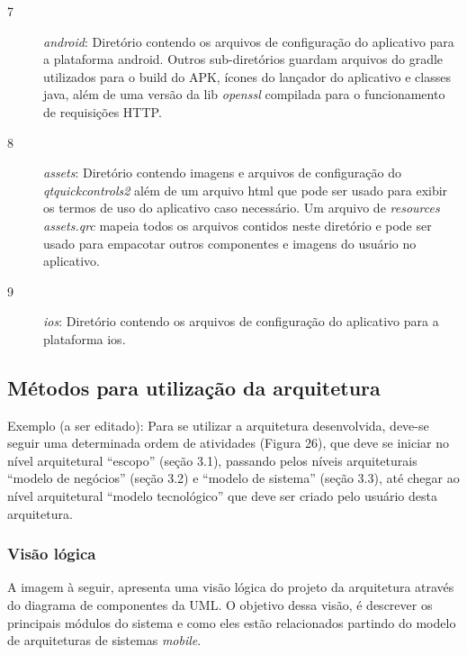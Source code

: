 \begin{description}
	\item[7] \textit{android}: Diretório contendo os arquivos de configuração do aplicativo para a plataforma android. Outros sub-diretórios guardam arquivos do gradle utilizados para o build do APK, ícones do lançador do aplicativo e classes java, além de uma versão da lib \textit{openssl} compilada para o funcionamento de requisições HTTP.
	\item[8] \textit{assets}: Diretório contendo imagens e arquivos de configuração do \textit{qtquickcontrols2} além de um arquivo html que pode ser usado para exibir os termos de uso do aplicativo caso necessário. Um arquivo de \textit{resources} \textit{assets.qrc} mapeia todos os arquivos contidos neste diretório e pode ser usado para empacotar outros componentes e imagens do usuário no aplicativo.
	\item[9] \textit{ios}: Diretório contendo os arquivos de configuração do aplicativo para a plataforma ios. 
\end{description}

\subsection{Métodos para utilização da arquitetura}
Exemplo (a ser editado): Para se utilizar a arquitetura desenvolvida, deve-se seguir uma determinada ordem de atividades (Figura 26), que deve se iniciar no nível arquitetural “escopo” (seção 3.1), passando pelos níveis arquiteturais “modelo de negócios” (seção 3.2) e “modelo de sistema” (seção 3.3), até chegar ao nível arquitetural “modelo tecnológico” que deve ser criado pelo usuário desta arquitetura.


\subsubsection{Visão lógica}
A imagem à seguir, apresenta uma visão lógica do projeto da arquitetura através do diagrama de componentes da UML. O objetivo dessa visão, é descrever os principais módulos do sistema e como eles estão relacionados partindo do modelo de arquiteturas de sistemas \textit{mobile}.


